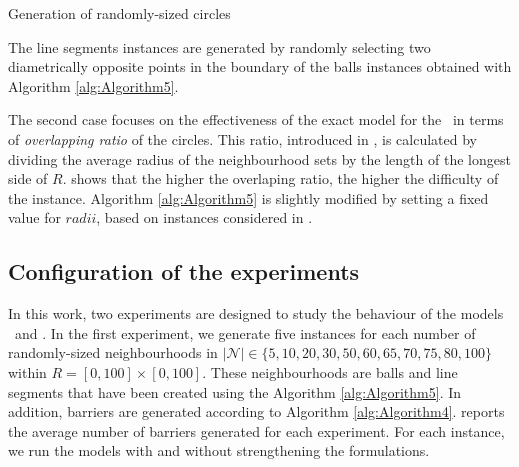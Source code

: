\documentclass[a4paper,  review, authoryear, 1p.]{elsarticle}
\newcommand{\TSPHN}{{\sf{H-TSPHN}\xspace }}
\newcommand{\TSPN}{{\sf{H-TSPN}\xspace }}
\newcommand{\CV}[1]{{\color{red}#1}}
\begin{document}
\begin{algorithm}[H]
	\caption{Generation of randomly-sized circles}
	\label{alg:Algorithm5}
	
\end{algorithm}

The line segments instances are generated by randomly selecting two diametrically opposite points in the boundary of the balls instances obtained with Algorithm \ref{alg:Algorithm5}.


The second case focuses on the effectiveness of the exact model for the \TSPN \ in terms of \emph{overlapping ratio} of the circles. This ratio, introduced in \cite{mennell2009a}, is calculated by dividing the average radius of the neighbourhood sets by the length of the longest side of $R$. \cite{mennell2009a} shows that the higher the overlaping ratio, the higher the difficulty of the instance. Algorithm \ref{alg:Algorithm5} is slightly modified by setting a fixed value for $radii$, based on instances considered in \cite{behdani2014}.



\subsection{Configuration of the experiments}
In this work, two experiments are designed to study the behaviour of the models \TSPHN \ and \TSPN. In the first experiment, we generate five instances for each number of randomly-sized neighbourhoods in $|\mathcal N|\in\{5, 10, 20, 30, 50, 60, 65, 70, 75, 80, 100\}$ within $R=[0,100]\times[0, 100]$. These neighbourhoods are balls and line segments that have been created using the Algorithm \ref{alg:Algorithm5}. \CV{In addition, barriers are generated according to Algorithm \ref{alg:Algorithm4}. \boldsymbol{$|\mathcal B|$} reports the average number of barriers generated for each experiment.} For each instance, we run the models with and without strengthening the formulations.
\end{document}
